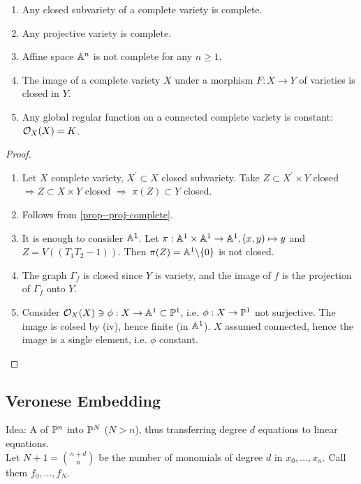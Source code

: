 \documentclass[a4paper,11pt]{article}
\begin{document}
			\begin{prop}
				\begin{enumerate}
					\item Any closed subvariety of a complete variety is complete.
					\item Any projective variety is complete.
					\item Affine space $\AA^n$ is not complete for any $n\ge1$.
					\item The image of a complete variety $X$ under a morphism $F:X\rightarrow Y$ of varieties is closed in $Y$.
					\item Any global regular function on a connected complete variety is constant: $\O_X(X)=K$.
				\end{enumerate}
			\end{prop}
			\begin{proof}
				\begin{enumerate}
					\item Let $X$ complete variety, $X^\prime\subset X$ closed subvariety. Take $Z\subset X^\prime\times Y$ closed  $\Longrightarrow Z\subset X\times Y$ closed $\Longrightarrow$ $\pi(Z)\subset Y$ closed.
					\item Follows from \autoref{prop--proj-complete}.
					\item It is enough to consider $\AA^1$. Let $\pi:\AA^1\times\AA^1\rightarrow\AA^1, (x,y)\mapsto y$ and $Z=V((T_1T_2-1))$. Then $\pi(Z)=\AA^1\backslash\{0\}$ is not closed. 
					\item The graph $\Gamma_f$ is closed since $Y$ is variety, and the image of $f$ is the projection of $\Gamma_f$ onto $Y$.
					\item Consider $\O_X(X)\ni\phi:X\rightarrow\AA^1\subset\P^1$, i.e. $\phi:X\rightarrow\P^1$ not surjective. The image is colsed by (iv), hence finite (in $\AA^1$). $X$ assumed connected, hence the image is a single element, i.e. $\phi$ constant.
				\end{enumerate}
			\end{proof}

		\subsection{Veronese Embedding}

			Idea: A  of $\P^n$ into $\P^N$ ($N>n$), thus transferring degree $d$ equations to linear equations.
			\\Let $N+1=\binom{n+d}{n}$ be the number of monomials of degree $d$ in $x_0,\dots,x_n$. Call them $f_0,\dots,f_N$.
\end{document}
